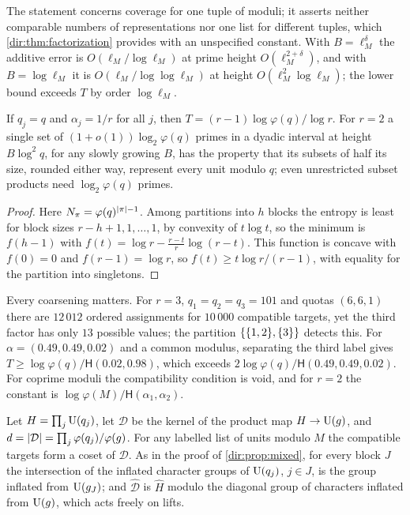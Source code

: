 The statement concerns coverage for one tuple of moduli; it asserts neither comparable numbers of
representations nor one list for different tuples, which \cref{dir:thm:factorization} provides with an
unspecified constant. With $B=\ell_M^\delta$ the additive error is $O(\ell_M/\log\ell_M)$ at prime height
$O(\ell_M^{2+\delta})$, and with $B=\log\ell_M$ it is $O(\ell_M/\log\log\ell_M)$ at height
$O(\ell_M^2\log\ell_M)$; the lower bound exceeds $T$ by order $\log\ell_M$.

\begin{corollary}\label{dir:cor:entropyequal}
If $q_j=q$ and $\alpha_j=1/r$ for all $j$, then $T=(r-1)\log\varphi(q)/\log r$. For $r=2$ a single set of
$(1+o(1))\log_2\varphi(q)$ primes in a dyadic interval at height $B\log^2q$, for any slowly growing $B$,
has the property that its subsets of half its size, rounded either way, represent every unit modulo
$q$; even unrestricted subset products need $\log_2\varphi(q)$ primes.
\end{corollary}

\begin{proof}
Here $N_\pi=\varphi(q)^{\lvert\pi\rvert-1}$. Among partitions into $h$ blocks the entropy is least for block
sizes $r-h+1,1,\dots,1$, by convexity of $t\log t$, so the minimum is $f(h-1)$ with
$f(t)=\log r-\frac{r-t}r\log(r-t)$. This function is concave with $f(0)=0$ and $f(r-1)=\log r$, so
$f(t)\ge t\log r/(r-1)$, with equality for the partition into singletons.
\end{proof}

Every coarsening matters. For $r=3$, $q_1=q_2=q_3=101$ and quotas $(6,6,1)$ there are $12\,012$ ordered
assignments for $10\,000$ compatible targets, yet the third factor has only $13$ possible values; the
partition $\{\{1,2\},\{3\}\}$ detects this. For $\alpha=(0.49,0.49,0.02)$ and a common modulus,
separating the third label gives $T\ge\log\varphi(q)/\mathsf H(0.02,0.98)$, which exceeds
$2\log\varphi(q)/\mathsf H(0.49,0.49,0.02)$. For coprime moduli the compatibility condition is void, and
for $r=2$ the constant is $\log\varphi(M)/\mathsf H(\alpha_1,\alpha_2)$.

Let $H=\prod_j\mathrm{U}(q_j)$, let $\mathcal D$ be the kernel of the product map $H\to\mathrm{U}(g)$, and
$d=\lvert\mathcal D\rvert=\prod_j\varphi(q_j)/\varphi(g)$. For any labelled list of units modulo $M$ the compatible
targets form a coset of $\mathcal D$. As in the proof of \cref{dir:prop:mixed}, for every block $J$ the
intersection of the inflated character groups of $\mathrm{U}(q_j)$, $j\in J$, is the group inflated from
$\mathrm{U}(g_J)$; and $\widehat{\mathcal D}$ is $\widehat H$ modulo the diagonal group of characters inflated
from $\mathrm{U}(g)$, which acts freely on lifts.

